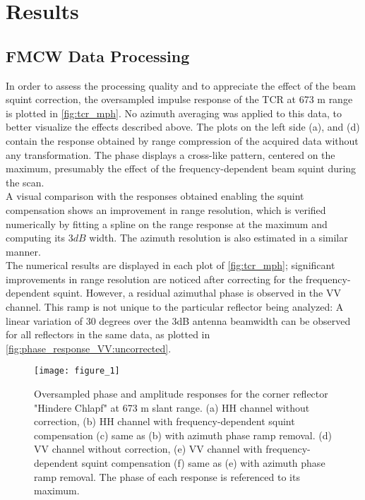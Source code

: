 \section{Results}\label{sec:results}
\subsection{FMCW Data Processing}\label{sec:res_SLC}
In order to assess the processing quality and to appreciate the effect of the beam squint correction,  the oversampled impulse response of the TCR at 673 m range is plotted in \autoref{fig:tcr_mph}. No azimuth averaging was applied to this data, to better visualize the effects described above. The plots on the left side (a), and (d) contain the response obtained by range compression of the acquired data without any transformation. The phase displays a cross-like pattern, centered on the maximum, presumably the effect of the frequency-dependent beam squint during the scan.\\ A visual comparison with the responses obtained enabling the squint compensation shows an improvement in range resolution, which is verified numerically by fitting a spline on the range response at the maximum and computing its $3 dB$ width. The azimuth resolution is also estimated in a similar manner.\\ The numerical results are displayed in each plot of \autoref{fig:tcr_mph}; significant improvements in range resolution are noticed after correcting for the frequency-dependent squint. However, a residual azimuthal phase is observed in the VV channel. This ramp is not unique to the particular reflector being analyzed: A linear variation of 30 degrees over the 3dB antenna beamwidth can be observed for all reflectors in the same data, as plotted in \autoref{fig:phase_response_VV:uncorrected}.
\begin{figure*}[ht]
	\centering
	\texttt{[image: figure\_1]}
	\caption{Oversampled phase and amplitude responses for the corner reflector "Hindere Chlapf" at 673 m slant range. (a) HH channel without correction, (b) HH channel with frequency-dependent squint compensation (c) same as (b) with azimuth phase ramp removal. (d) VV channel without correction, (e) VV channel with frequency-dependent squint compensation (f) same as (e) with azimuth phase ramp removal.
	The phase of each response is referenced to its maximum.}
	\label{fig:tcr_mph}
\end{figure*}

